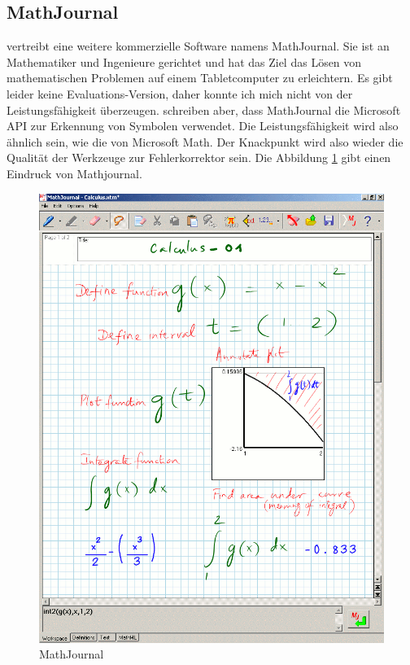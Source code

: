 \subsection{MathJournal}

\citet{mathjournal} vertreibt eine weitere kommerzielle Software namens MathJournal. Sie ist an Mathematiker und Ingenieure gerichtet und hat das Ziel das Lösen von mathematischen Problemen auf einem Tabletcomputer zu erleichtern. Es gibt leider keine Evaluations-Version, daher konnte ich mich nicht von der Leistungsfähigkeit überzeugen. \citet{Tapia:2007p9160} schreiben aber, dass MathJournal die Microsoft API zur Erkennung von Symbolen verwendet. Die Leistungsfähigkeit wird also ähnlich sein, wie die von Microsoft Math. Der Knackpunkt wird also wieder die Qualität der Werkzeuge zur Fehlerkorrektor sein. Die Abbildung \ref{fig:mathjournal} gibt einen Eindruck von Mathjournal.

\begin{figure}[htbp]
  \begin{center}
    \includegraphics[width=.9\textwidth]{figures/mathjournal.png}
  \end{center}
  \caption{MathJournal}
  \label{fig:mathjournal}
\end{figure}

